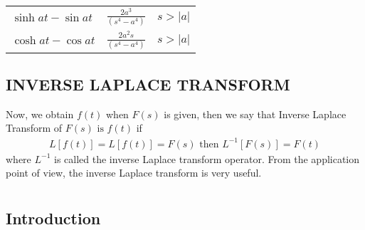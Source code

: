 \documentclass[12pt]{report}
\begin{document}
\begin{center}
\begin{tabular}{llcccc}
		\multicolumn{2}{l}{$\displaystyle \sinh at - \sin at $} & \multicolumn{2}{c}{$\displaystyle \frac{2a^3}{(s^4 - a^4) }$} & \multicolumn{2}{c}{$s > |a|$} \\


\multicolumn{2}{l}{$\displaystyle \cosh at - \cos at $} & \multicolumn{2}{c}{$\displaystyle \frac{2a^{2}s}{(s^4 - a^4) }$} & \multicolumn{2}{c}{$s > |a|$} \\



	\end{tabular}
	
\end{center}
\section{INVERSE LAPLACE TRANSFORM}
\qquad Now, we obtain $f(t)$ when $F(s)$ is given, then we say that Inverse Laplace Transform of $F(s) \mbox{ is } f(t)$ if
\begin{align*}
L[f(t)]=L[f(t)]=F(s) \mbox{ then } L^{-1}[F(s)]=F(t)
\end{align*}
where $L^{-1}$ is called the inverse Laplace transform operator. From the application point of view, the inverse Laplace transform is very useful.



\chapter{}
\section{Introduction}
\newcommand{\Laplace}{\mathcal{L}}
\newcommand{\ft}{f(t)}
\newcommand{\ftn}[1]{f^{#1}(t)}
\newcommand{\FS}{F(S)}
\newcommand{\FSn}[1]{F^{#1}(S)}
\newcommand{\LaplaceIntegral}{\int_{0}^{-\infty}e^{-st}\ft\text{dt}}
\newcommand{\sbracket}[1]{\left[#1\right]}
\newcommand{\Y}{Y}
\newcommand{\Yn}[1]{y^{#1}(0)}
\newcommand{\fn}[1]{f^{#1}(0)}
\newcommand{\Sn}[1]{s^{#1}}
\newcommand{\LUx}[1]{\Laplace\sbracket{u_{#1}(x,t)}}
\newcommand{\Un}[2]{u_{#1}(#2)}
\newcommand{\LInt}{\int_{0}^{\infty}e^{-st}u(x,t)\text{dt}}
\newcommand{\LFt}{\Laplace \sbracket{\ftn{}}}
\newcommand{\NI}{\noindent}
\newcommand{\LFn}[1]{\Laplace \sbracket{#1}}
\newcommand{\Dtl}[1]{\Delta_{#1}}
\newcommand{\sqL}[1]{#1^{2}}
\newcommand{\sqLn}[2]{#1^{#2}}
\newcommand{\psq}{\pi^{2}}
\newcommand{\psqn}[1]{\pi^{#1}}
\newcommand{\InverseL}[1]{\Laplace^{-1}\left[#1\right]}
\newcommand{\LT}[1]{\Laplace \left[#1\right]}
\newcommand{\LTb}[1]{\Laplace \left(#1\right)}
\newcommand{\Unx}[1]{\Un{#1}{x,t}}
\newcommand{\InverseLx}[1]{\Laplace^{-1}\left\{ #1 \right\}}
\newcommand{\Usub}[1]{u_{#1}}
\newcommand{\Usup}[1]{u^{#1}}
\end{document}

